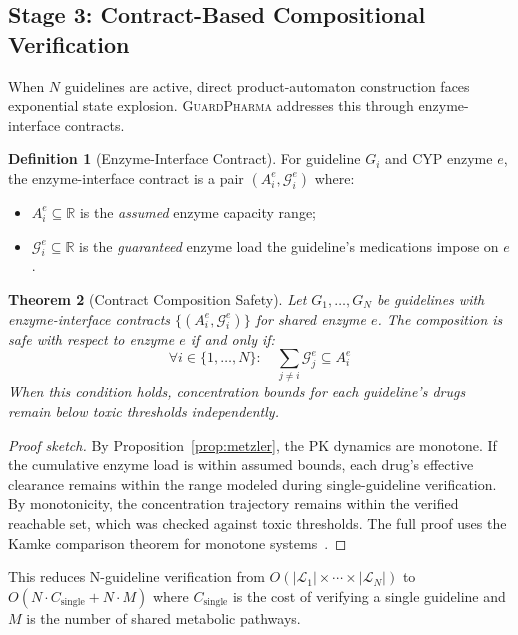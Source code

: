 \documentclass{article}
\newtheorem{theorem}{Theorem}[section]
\theoremstyle{definition}
\newtheorem{definition}[theorem]{Definition}
\begin{document}
\subsection{Stage 3: Contract-Based Compositional Verification}

When $N$ guidelines are active, direct product-automaton construction faces exponential state explosion. \textsc{GuardPharma} addresses this through enzyme-interface contracts.

\begin{definition}[Enzyme-Interface Contract]
\label{def:contract}
For guideline $G_i$ and CYP enzyme $e$, the enzyme-interface contract is a pair $(A_i^e, \mathcal{G}_i^e)$ where:
\begin{itemize}
\item $A_i^e \subseteq \mathbb{R}$ is the \emph{assumed} enzyme capacity range;
\item $\mathcal{G}_i^e \subseteq \mathbb{R}$ is the \emph{guaranteed} enzyme load the guideline's medications impose on $e$.
\end{itemize}
\end{definition}

\begin{theorem}[Contract Composition Safety]
\label{thm:contract}
Let $G_1, \ldots, G_N$ be guidelines with enzyme-interface contracts $\{(A_i^e, \mathcal{G}_i^e)\}$ for shared enzyme $e$. The composition is safe with respect to enzyme $e$ if and only if:
\[
\forall i \in \{1,\ldots,N\}: \quad \sum_{j \neq i} \mathcal{G}_j^e \subseteq A_i^e
\]
When this condition holds, concentration bounds for each guideline's drugs remain below toxic thresholds independently.
\end{theorem}

\begin{proof}[Proof sketch]
By Proposition~\ref{prop:metzler}, the PK dynamics are monotone. If the cumulative enzyme load is within assumed bounds, each drug's effective clearance remains within the range modeled during single-guideline verification. By monotonicity, the concentration trajectory remains within the verified reachable set, which was checked against toxic thresholds. The full proof uses the Kamke comparison theorem for monotone systems~\cite{kamke1932,smith2008monotone}.
\end{proof}

This reduces N-guideline verification from $O(|\mathcal{L}_1| \times \cdots \times |\mathcal{L}_N|)$ to $O(N \cdot C_{\text{single}} + N \cdot M)$ where $C_{\text{single}}$ is the cost of verifying a single guideline and $M$ is the number of shared metabolic pathways.
\end{document}
